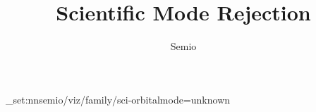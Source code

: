 \documentclass[type=paper,language=de,theme=dark]{semio}
\title{Scientific Mode Rejection}
\author{Semio}
\date{}
\begin{document}
\SemioVizProbePage
\ExplSyntaxOn\keys_set:nn{semio/viz/family/sci-orbital}{mode=unknown}\ExplSyntaxOff
{}
\SemioVizProbeEnd
\end{document}
